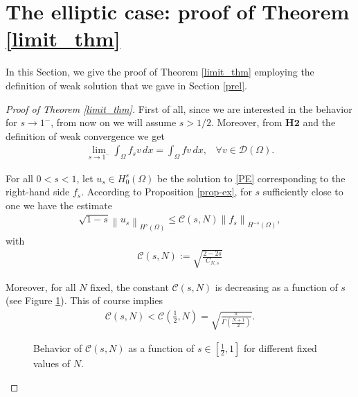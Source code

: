 \documentclass[reqno,twoside]{amsart}
\numberwithin{equation}{section}
\newcommand{\norm}[2]{{\left\|#1\right\|}_{#2}}
\newcommand{\cns}{C_{N,s}}
\begin{document}
\section{The elliptic case: proof of Theorem \ref{limit_thm}}\label{weak_sec}
In this Section, we give the proof of Theorem \ref{limit_thm} employing the definition of weak solution that we gave in Section \ref{prel}. 

\begin{proof}[Proof of Theorem \ref{limit_thm}]
First of all, since we are interested in the behavior for $s\to 1^-$, from now on we will assume $s> 1/2$.  
Moreover, from $\textbf{H2}$ and the definition of weak convergence we get 
\begin{align}\label{limit-rhs}
	\lim_{s\to 1^-}\int_{\Omega} f_sv\,dx = \int_{\Omega} fv\,dx, \;\;\; \forall v\in\mathcal{D}(\Omega).
\end{align}

For all $0<s<1$, let $u_s\in H_0^s(\Omega)$ be the solution to \eqref{PE} corresponding to the right-hand side $f_s$. According to Proposition \ref{prop-ex}, for $s$ sufficiently close to one we have the estimate
\begin{align}\label{norm_est}
	\sqrt{1-s}\norm{u_s}{H^s(\Omega)}\leq\mathcal{C}(s,N)\norm{f_s}{H^{-s}(\Omega)},
\end{align}
with 
\begin{align*}
	\mathcal{C}(s,N) := \sqrt{\frac{2-2s}{\cns}}
\end{align*}

Moreover, for all $N$ fixed, the constant $\mathcal{C}(s,N)$ is decreasing as a function of $s$ (see Figure \ref{figure}). This of course implies
\begin{align*}
	\mathcal{C}(s,N) < \mathcal{C}\left(\frac 12,N\right) = \sqrt{\frac{\pi}{\Gamma\left(\frac{N+1}{2}\right)}}.
\end{align*}

\begin{figure}[h]
\centering
{}
%
\caption{Behavior of $\mathcal{C}(s,N)$ as a function of $s\in\left[\frac 12,1\right]$ for different fixed values of $N$.}\label{figure}
\end{figure}


\end{proof}
\end{document}
